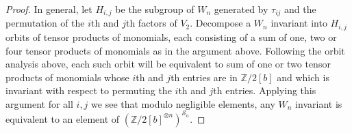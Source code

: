 \documentclass[10pt,a4paper]{amsart}
\newcommand{\Z}{\mathbb{Z}}
\newcommand{\si}{\mathcal{S}}
\begin{document}
\begin{proof}
In general, let $H_{i,j}$ be the subgroup of $W_n$ generated by
$\tau_{ij}$ and the permutation of the $i$th and $j$th
factors of $V_2$.
Decompose a $W_n$ invariant into $H_{i,j}$ orbits of tensor products of monomials,
each consisting of a sum of one, two or four tensor products of monomials as in the argument above.
Following the orbit analysis above, 
each such orbit will be equivalent to sum of one or two 
tensor products of monomials
whose $i$th and $j$th entries are in $\Z/2[b]$ and which
is invariant with respect to permuting the $i$th and $j$th entries.
    Applying this argument
    for all $i, j$ we see that modulo
    negligible elements, any $W_n$ invariant is equivalent to
    an element of $\left(\Z/2[b]^{\otimes n}\right)^{\si_n}$.
\end{proof} 
\end{document}
